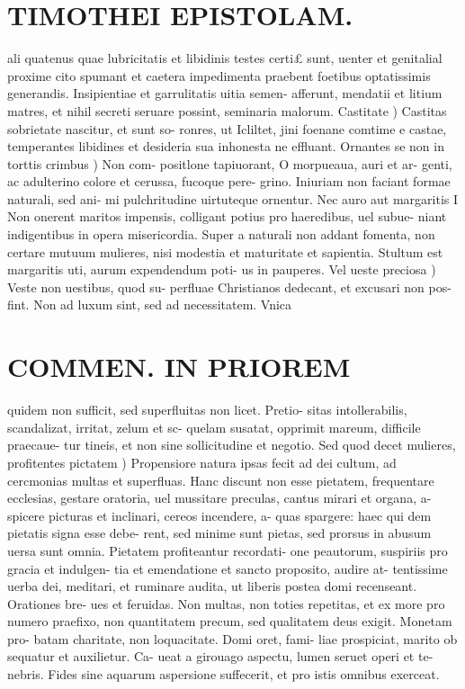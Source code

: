 \documentclass{article}
\begin{document}
\begin{pages}
\section*{TIMOTHEI EPISTOLAM. }
\marginpar{[ p.58 ]}\pstart ali quatenus quae lubricitatis et libidinis testes certi£ sunt, uenter et genitalial proxime cito spumant et caetera impedimenta praebent foetibus optatissimis generandis. Insipientiae et garrulitatis uitia semen- afferunt, mendatii et litium matres, et nihil secreti seruare possint, seminaria malorum.  \pend\pstart Castitate ) Castitas sobrietate nascitur, et sunt so- ronres, ut Icliltet, jini foenane comtime e castae, temperantes libidines et desideria sua inhonesta ne effluant.  \pend\pstart Ornantes se non in torttis crimbus ) Non com- positlone tapiuorant, O morpueaua, auri et ar- genti, ac adulterino colore et cerussa, fucoque pere- grino. Iniuriam non faciant formae naturali, sed ani- mi pulchritudine uirtuteque ornentur.  \pend\pstart Nec auro aut margaritis I Non onerent maritos impensis, colligant potius pro haeredibus, uel subue- niant indigentibus in opera misericordia. Super a naturali non addant fomenta, non certare mutuum mulieres, nisi modestia et maturitate et sapientia. Stultum est margaritis uti, aurum expendendum poti- us in pauperes.  \pend\pstart Vel ueste preciosa ) Veste non uestibus, quod su- perfluae Christianos dedecant, et excusari non pos- fint. Non ad luxum sint, sed ad necessitatem. Vnica  \pend
\section*{COMMEN. IN PRIOREM }
\marginpar{[ p.59 ]}\pstart quidem non sufficit, sed superfluitas non licet. Pretio- sitas intollerabilis, scandalizat, irritat, zelum et sc- quelam susatat, opprimit mareum, difficile praecaue- tur tineis, et non sine sollicitudine et negotio.  \pend\pstart Sed quod decet mulieres, profitentes pictatem )  Propensiore natura ipsas fecit ad dei cultum, ad cercmonias multas et superfluas. Hanc discunt non esse pietatem, frequentare ecclesias, gestare oratoria, uel mussitare preculas, cantus mirari et organa, a- spicere picturas et inclinari, cereos incendere, a- quas spargere: haec qui dem pietatis signa esse debe- rent, sed minime sunt pietas, sed prorsus in abusum uersa sunt omnia. Pietatem profiteantur recordati- one peautorum, suspiriis pro gracia et indulgen- tia et emendatione et sancto proposito, audire at- tentissime uerba dei, meditari, et ruminare audita, ut liberis postea domi recenseant. Orationes bre- ues et feruidas. Non multas, non toties repetitas, et ex more pro numero praefixo, non quantitatem precum, sed qualitatem deus exigit. Monetam pro- batam charitate, non loquacitate. Domi oret, fami- liae prospiciat, marito ob sequatur et auxilietur. Ca- ueat a girouago aspectu, lumen seruet operi et te- nebris. Fides sine aquarum aspersione suffecerit, et pro istis omnibus exerceat.  \pend

\end{pages}
\end{document}
